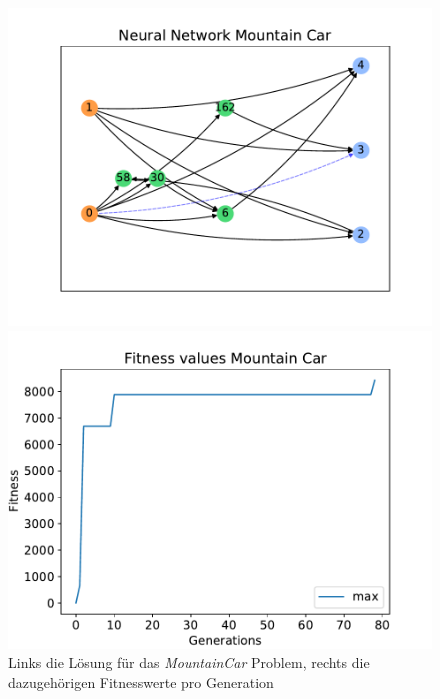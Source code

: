 \begin{figure}[!h]
	\centering
	\begin{minipage}[]{0.49\textwidth}
		\includegraphics[width=1.0\textwidth]{./img/mountain_car_single/mountain_car_neural_network.pdf} 
	\end{minipage}
	\hfill
	\begin{minipage}[]{0.49\textwidth}
		\includegraphics[width=1.0\textwidth]{./img/mountain_car_single/1413_fitness_1core_1pi.pdf} 
	\end{minipage}
	\caption{Links die Lösung für das \emph{MountainCar} Problem, rechts die dazugehörigen Fitnesswerte pro Generation}
	\label{fig:mountain_car_1core_neural_network_and_fitness}
\end{figure}
